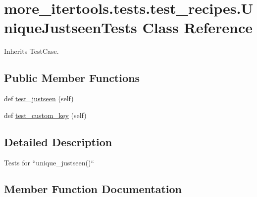 \hypertarget{classmore__itertools_1_1tests_1_1test__recipes_1_1_unique_justseen_tests}{}\section{more\+\_\+itertools.\+tests.\+test\+\_\+recipes.\+Unique\+Justseen\+Tests Class Reference}
\label{classmore__itertools_1_1tests_1_1test__recipes_1_1_unique_justseen_tests}


Inherits Test\+Case.

\subsection*{Public Member Functions}
\begin{DoxyCompactItemize}
\item 
def \hyperlink{classmore__itertools_1_1tests_1_1test__recipes_1_1_unique_justseen_tests_a08caf99d3d49be3ce53998a075710a82}{test\+\_\+justseen} (self)
\item 
def \hyperlink{classmore__itertools_1_1tests_1_1test__recipes_1_1_unique_justseen_tests_a9c26a4bb7dd8dc277556962d5ce5c2eb}{test\+\_\+custom\+\_\+key} (self)
\end{DoxyCompactItemize}


\subsection{Detailed Description}
\begin{DoxyVerb}Tests for ``unique_justseen()``\end{DoxyVerb}
 

\subsection{Member Function Documentation}
\mbox{\label{classmore__itertools_1_1tests_1_1test__recipes_1_1_unique_justseen_tests_a9c26a4bb7dd8dc277556962d5ce5c2eb}} 
